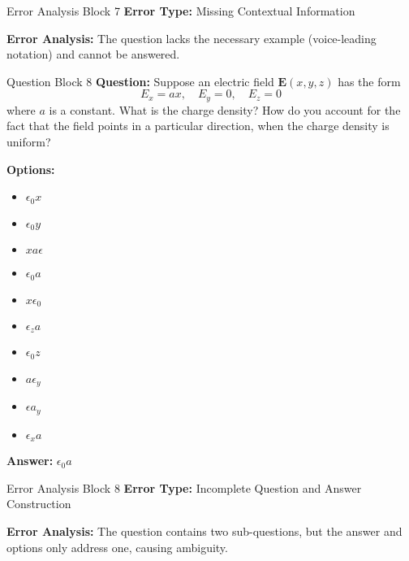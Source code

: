 \begin{errorbox}{Error Analysis Block 7}
\noindent \textbf{Error Type:} Missing Contextual Information

\noindent \textbf{Error Analysis:} The question lacks the necessary example (voice-leading notation) and cannot be answered.
\end{errorbox}

\begin{questionbox}{Question Block 8}
\noindent \textbf{Question:} Suppose an electric field $\mathbf{E}(x, y, z)$ has the form  
$$  
E_{x} = ax, \quad E_{y} = 0, \quad E_{z} = 0  
$$  
where $a$ is a constant. What is the charge density? How do you account for the fact that the field points in a particular direction, when the charge density is uniform?

\bigskip
\noindent \textbf{Options:}
\begin{itemize}
    \item $\epsilon_{0} x$
    \item $\epsilon_{0} y$
    \item $x a \epsilon$
    \item $\epsilon_{0} a$
    \item $x \epsilon_{0}$
    \item $\epsilon_{z} a$
    \item $\epsilon_{0} z$
    \item $a \epsilon_{y}$
    \item $\epsilon a_{y}$
    \item $\epsilon_{x} a$
\end{itemize}

\noindent \textbf{Answer:} $\epsilon_{0} a$
\end{questionbox}

\begin{errorbox}{Error Analysis Block 8}
\noindent \textbf{Error Type:} Incomplete Question and Answer Construction

\noindent \textbf{Error Analysis:} The question contains two sub-questions, but the answer and options only address one, causing ambiguity.
\end{errorbox}

